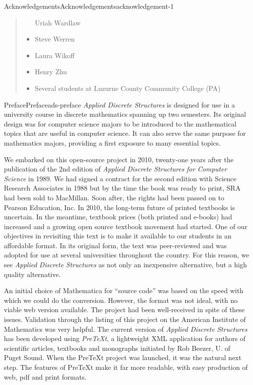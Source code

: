 \documentclass[twoside,10pt,]{book}
\numberwithin{equation}{section}
\begin{document}
\begin{acknowledgement}{Acknowledgements}{}{Acknowledgements}{}{}{acknowledgement-1}
\begin{quote}
\begin{multicols}{2}
\begin{itemize}[label=\textbullet]
Uriah Wardlaw%
\item{}\hypertarget{p-136}{}%
Steve Werren%
\item{}\hypertarget{p-137}{}%
Laura Wikoff%
\item{}\hypertarget{p-138}{}%
Henry Zhu%
\item{}\hypertarget{p-139}{}%
Several students at Luzurne County Community College (PA)%
\end{itemize}
\end{multicols}
%
\end{quote}
\end{acknowledgement}
%
%
\typeout{************************************************}
\typeout{************************************************}
%
\begin{preface}{Preface}{}{Preface}{}{}{ads-preface}
\hypertarget{p-140}{}%
\emph{Applied Discrete Structures} is designed for use in a university course in discrete mathematics spanning up two semesters.   Its original design was for computer science majors to be introduced to the mathematical topics that are useful in computer science.   It can also serve the same purpose for mathematics majors, providing a first exposure to many essential topics.%
\par
\hypertarget{p-141}{}%
We embarked on this open-source project in 2010, twenty-one years after the publication of the 2nd edition of \emph{Applied Discrete Structures for Computer Science} in 1989.   We had signed a contract for the second edition with Science Research Associates in 1988 but by the time the book was ready to print, SRA had been sold to MacMillan. Soon after, the rights had been passed on to Pearson Education, Inc. In 2010, the long-term future of printed textbooks is uncertain. In the meantime, textbook prices (both printed and e-books) had increased and a growing open source textbook movement had started. One of our objectives in revisiting this text is to make it available to our students in an affordable format. In its original form, the text was peer-reviewed and was adopted for use at several universities throughout the country. For this reason, we see \emph{Applied Discrete Structures} as not only an inexpensive alternative, but a high quality alternative.%
\par
\hypertarget{p-142}{}%
An initial choice of Mathematica for ``source code'' was based on the speed with which we could do the conversion.  However, the format was not ideal, with no viable web version available.  The project had been well-received in spite of these issues.  Validation through the listing of this project on the American Institute of Mathematics was very helpful. The current version of \emph{Applied Discrete Structures} has been developed using \emph{PreTeXt}, a lightweight XML application for authors of scientific articles, textbooks and monographs initiated by Rob Beezer, U. of Puget Sound.  When the PreTeXt project was launched, it was the natural next step.  The features of PreTeXt make it far more readable, with easy production of web, pdf and print formats.%

\end{preface}
\end{document}
